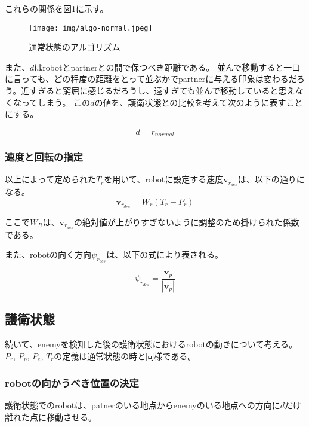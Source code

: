 \documentclass{kuisthesis}
\begin{document}
これらの関係を図\ref{fig:algo-normal}に示す。

\begin{figure}[h]\begin{center}
	\texttt{[image: img/algo-normal.jpeg]}
	\caption{通常状態のアルゴリズム}
	\label{fig:algo-normal}
\end{center}\end{figure}

また、$d$はrobotとpartnerとの間で保つべき距離である。
並んで移動すると一口に言っても、どの程度の距離をとって並ぶかでpartnerに与える印象は変わるだろう。近すぎると窮屈に感じるだろうし、遠すぎても並んで移動していると思えなくなってしまう。
この$d$の値を、護衛状態との比較を考えて次のように表すことにする。

\begin{equation}
d  = r_{normal} \nonumber
\end{equation}

\subsubsection*{速度と回転の指定}

以上によって定められた$T_r$を用いて、robotに設定する速度$\bm{v}_r_{des}$は、以下の通りになる。
\begin{equation}
	\bm{v}_r_{des} = W_r (T_r - P_r) \nonumber
\end{equation}

ここで$W_R$は、$\bm{v}_r_{des}$の絶対値が上がりすぎないように調整のため掛けられた係数である。

また、robotの向く方向$\psi_r_{des}$は、以下の式により表される。

\begin{equation}
	\psi_r_{des} = \frac{\bm{v}_p}{|\bm{v}_p|} \nonumber
\end{equation}


\subsection{護衛状態}

続いて、enemyを検知した後の護衛状態におけるrobotの動きについて考える。
$P_r$, $P_p$, $P_e$, $T_r$の定義は通常状態の時と同様である。

\subsubsection*{robotの向かうべき位置の決定}

護衛状態でのrobotは、patnerのいる地点からenemyのいる地点への方向に$d$だけ離れた点に移動させる。
\end{document}
